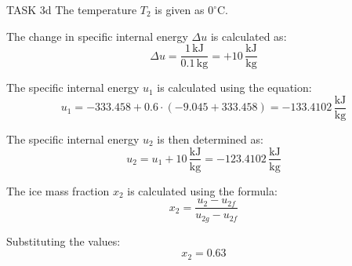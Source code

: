TASK 3d  
The temperature \( T_2 \) is given as \( 0^\circ\text{C} \).  

The change in specific internal energy \( \Delta u \) is calculated as:  
\[
\Delta u = \frac{1 \, \text{kJ}}{0.1 \, \text{kg}} = +10 \, \frac{\text{kJ}}{\text{kg}}
\]

The specific internal energy \( u_1 \) is calculated using the equation:  
\[
u_1 = -333.458 + 0.6 \cdot (-9.045 + 333.458) = -133.4102 \, \frac{\text{kJ}}{\text{kg}}
\]

The specific internal energy \( u_2 \) is then determined as:  
\[
u_2 = u_1 + 10 \, \frac{\text{kJ}}{\text{kg}} = -123.4102 \, \frac{\text{kJ}}{\text{kg}}
\]

The ice mass fraction \( x_2 \) is calculated using the formula:  
\[
x_2 = \frac{u_2 - u_{2f}}{u_{2g} - u_{2f}}
\]

Substituting the values:  
\[
x_2 = 0.63
\]